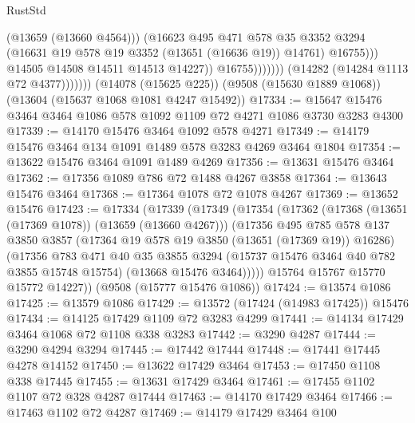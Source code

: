 \begin{lexlean}{RustStd}
\begin{coremodule}
                                      (@13659 (@13660 @4564)))
                                    (@16623
                                      @495
                                      @471
                                      @578
                                      @35
                                      @3352
                                      @3294
                                      (@16631 @19 @578 @19 @3352 (@13651 (@16636 @19)) @14761)
                                      @16755)))
                                @14505
                                @14508
                                @14511
                                @14513
                                @14227))
                            @16755)))))))
              (@14282 (@14284 @1113 @72 @4377)))))))
    (@14078 (@15625 @225))
    (@9508 (@15630 @1889 @1068))
    (@13604 (@15637 @1068 @1081 @4247 @15492))
@17334 := @15647 @15476 @3464 @3464 @1086 @578 @1092 @1109 @72 @4271 @1086 @3730 @3283 @4300
@17339 := @14170 @15476 @3464 @1092 @578 @4271
@17349 := @14179 @15476 @3464 @134 @1091 @1489 @578 @3283 @4269 @3464 @1804
@17354 := @13622 @15476 @3464 @1091 @1489 @4269
@17356 := @13631 @15476 @3464
@17362 := @17356 @1089 @786 @72 @1488 @4267 @3858
@17364 := @13643 @15476 @3464
@17368 := @17364 @1078 @72 @1078 @4267
@17369 := @13652 @15476
@17423 := @17334
    (@17339
      (@17349
        (@17354
          (@17362
            (@17368 (@13651 (@17369 @1078)) (@13659 (@13660 @4267)))
            (@17356
              @495
              @785
              @578
              @137
              @3850
              @3857
              (@17364 @19 @578 @19 @3850 (@13651 (@17369 @19)) @16286)
              (@17356
                @783
                @471
                @40
                @35
                @3855
                @3294
                (@15737 @15476 @3464 @40 @782 @3855 @15748 @15754)
                (@13668 @15476 @3464)))))
        @15764
        @15767
        @15770
        @15772
        @14227))
    (@9508 (@15777 @15476 @1086))
@17424 := @13574 @1086
@17425 := @13579 @1086
@17429 := @13572 (@17424 (@14983 @17425)) @15476
@17434 := @14125 @17429 @1109 @72 @3283 @4299
@17441 := @14134 @17429 @3464 @1068 @72 @1108 @338 @3283
@17442 := @3290 @4287
@17444 := @3290 @4294 @3294
@17445 := @17442 @17444
@17448 := @17441 @17445 @4278 @14152
@17450 := @13622 @17429 @3464
@17453 := @17450 @1108 @338 @17445
@17455 := @13631 @17429 @3464
@17461 := @17455 @1102 @1107 @72 @328 @4287 @17444
@17463 := @14170 @17429 @3464
@17466 := @17463 @1102 @72 @4287
@17469 := @14179 @17429 @3464 @100

\end{coremodule}
\end{lexlean}
